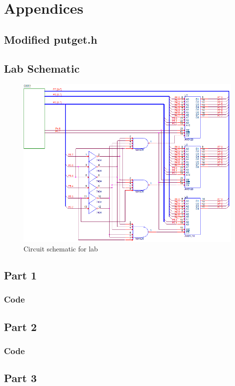 \documentclass[12pt]{article}
\begin{document}
\section{Appendices}
\subsection{Modified putget.h}

\subsection{Lab Schematic}
	\begin{figure}[H]
		\centering
		\includegraphics[width=\textwidth]{Schematic.png}
		\caption{Circuit schematic for lab}
		\label{schematic}
	\end{figure}
\pagebreak
\subsection{Part 1}
\subsubsection{Code}
	
\subsection{Part 2}
\subsubsection{Code}
		
\subsection{Part 3}
\end{document}

